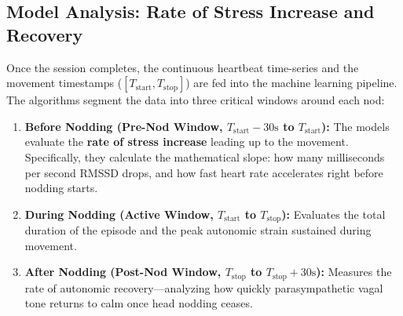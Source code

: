 \documentclass[12pt,a4paper,oneside]{report}
\begin{document}
\subsection{Model Analysis: Rate of Stress Increase and Recovery}
Once the session completes, the continuous heartbeat time-series and the movement timestamps ($[T_{\text{start}}, T_{\text{stop}}]$) are fed into the machine learning pipeline. The algorithms segment the data into three critical windows around each nod:
\begin{enumerate}[leftmargin=1.5cm, label=\textbf{\arabic*.}]
    \item \textbf{Before Nodding (Pre-Nod Window, $T_{\text{start}} - 30\text{s}$ to $T_{\text{start}}$):} The models evaluate the \textbf{rate of stress increase} leading up to the movement. Specifically, they calculate the mathematical slope: how many milliseconds per second RMSSD drops, and how fast heart rate accelerates right before nodding starts.
    \item \textbf{During Nodding (Active Window, $T_{\text{start}}$ to $T_{\text{stop}}$):} Evaluates the total duration of the episode and the peak autonomic strain sustained during movement.
    \item \textbf{After Nodding (Post-Nod Window, $T_{\text{stop}}$ to $T_{\text{stop}} + 30\text{s}$):} Measures the rate of autonomic recovery—analyzing how quickly parasympathetic vagal tone returns to calm once head nodding ceases.
\end{enumerate}
\end{document}
